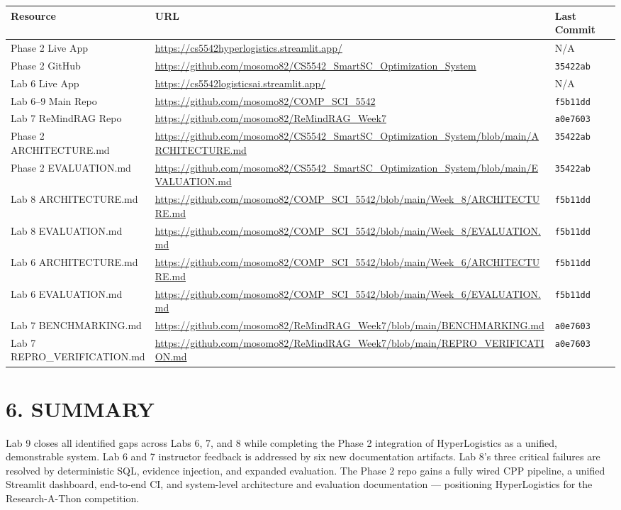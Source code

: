 \documentclass[11pt, letterpaper]{article}
\begin{document}
\begin{table}[h!]\centering
\begin{tabularx}{\textwidth}{@{} l X l @{}}
\toprule
\textbf{Resource} & \textbf{URL} & \textbf{Last Commit} \\
\midrule
Phase 2 Live App & \url{https://cs5542hyperlogistics.streamlit.app/} & N/A \\
Phase 2 GitHub & \url{https://github.com/mosomo82/CS5542_SmartSC_Optimization_System} & \texttt{35422ab} \\
Lab 6 Live App & \url{https://cs5542logisticsai.streamlit.app/} & N/A \\
Lab 6--9 Main Repo & \url{https://github.com/mosomo82/COMP_SCI_5542} & \texttt{f5b11dd} \\
Lab 7 ReMindRAG Repo & \url{https://github.com/mosomo82/ReMindRAG_Week7} & \texttt{a0e7603} \\
Phase 2 ARCHITECTURE.md & \url{https://github.com/mosomo82/CS5542_SmartSC_Optimization_System/blob/main/ARCHITECTURE.md} & \texttt{35422ab} \\
Phase 2 EVALUATION.md & \url{https://github.com/mosomo82/CS5542_SmartSC_Optimization_System/blob/main/EVALUATION.md} & \texttt{35422ab} \\
Lab 8 ARCHITECTURE.md & \url{https://github.com/mosomo82/COMP_SCI_5542/blob/main/Week_8/ARCHITECTURE.md} & \texttt{f5b11dd} \\
Lab 8 EVALUATION.md & \url{https://github.com/mosomo82/COMP_SCI_5542/blob/main/Week_8/EVALUATION.md} & \texttt{f5b11dd} \\
Lab 6 ARCHITECTURE.md & \url{https://github.com/mosomo82/COMP_SCI_5542/blob/main/Week_6/ARCHITECTURE.md} & \texttt{f5b11dd} \\
Lab 6 EVALUATION.md & \url{https://github.com/mosomo82/COMP_SCI_5542/blob/main/Week_6/EVALUATION.md} & \texttt{f5b11dd} \\
Lab 7 BENCHMARKING.md & \url{https://github.com/mosomo82/ReMindRAG_Week7/blob/main/BENCHMARKING.md} & \texttt{a0e7603} \\
Lab 7 REPRO\_VERIFICATION.md & \url{https://github.com/mosomo82/ReMindRAG_Week7/blob/main/REPRO_VERIFICATION.md} & \texttt{a0e7603} \\
\bottomrule
\end{tabularx}
\end{table}

\section{6. SUMMARY}
Lab 9 closes all identified gaps across Labs 6, 7, and 8 while completing the Phase 2 integration of HyperLogistics as a unified, demonstrable system. Lab 6 and 7 instructor feedback is addressed by six new documentation artifacts. Lab 8's three critical failures are resolved by deterministic SQL, evidence injection, and expanded evaluation. The Phase 2 repo gains a fully wired CPP pipeline, a unified Streamlit dashboard, end-to-end CI, and system-level architecture and evaluation documentation — positioning HyperLogistics for the Research-A-Thon competition.
\end{document}
